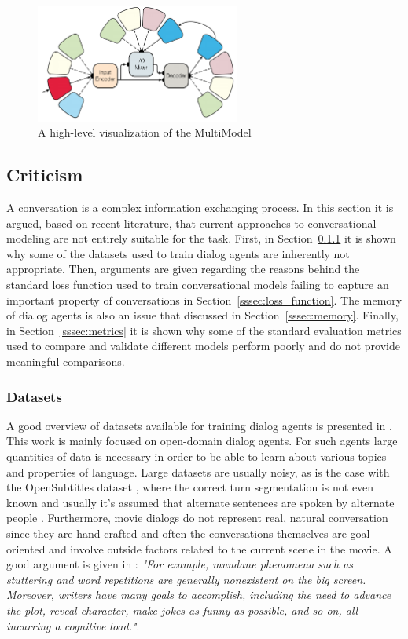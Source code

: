\documentclass[12pt]{article}
\begin{document}
\begin{figure}[H]
	\centering
	\includegraphics[width=0.6\textwidth]{pics/multimodel.png}
	\caption{A high-level visualization of the MultiModel \cite{Kaiser_one_model:2017}}
	\label{fig:multimodel}
\end{figure}

\subsection{Criticism} \label{ssec:problems}
A conversation is a complex information exchanging process. In this section it is argued, based on recent literature, that current approaches to conversational modeling are not entirely suitable for the task. First, in Section~\ref{sssec:datasets} it is shown why some of the datasets used to train dialog agents are inherently not appropriate. Then, arguments are given regarding the reasons behind the standard loss function used to train conversational models failing to capture an important property of conversations in Section~\ref{sssec:loss_function}. The memory of dialog agents is also an issue that discussed in Section~\ref{sssec:memory}. Finally, in Section~\ref{sssec:metrics} it is shown why some of the standard evaluation metrics used to compare and validate different models perform poorly and do not provide meaningful comparisons.
	
\subsubsection{Datasets} \label{sssec:datasets}
A good overview of datasets available for training dialog agents is presented in \cite{Serban_survey:2015}. This work is mainly focused on open-domain dialog agents. For such agents large quantities of data is necessary in order to be able to learn about various topics and properties of language. Large datasets are usually noisy, as is the case with the OpenSubtitles dataset \cite{OpenSubtitles:2016,opensubtitles}, where the correct turn segmentation is not even known and usually it's assumed that alternate sentences are spoken by alternate people \cite{Vinyals:2015}. Furthermore, movie dialogs do not represent real, natural conversation since they are hand-crafted and often the conversations themselves are goal-oriented and involve outside factors related to the current scene in the movie. A good argument is given in \cite{Danescu:2011}: \textit{"For example, mundane phenomena such as stuttering and word repetitions are generally nonexistent on the big screen. Moreover, writers have many goals to accomplish, including the need to advance the plot, reveal character, make jokes as funny as possible, and so on, all incurring a cognitive load."}.
\end{document}
